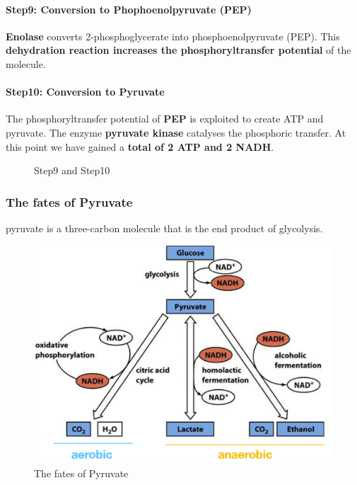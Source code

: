 \documentclass[../main.tex]{subfiles}
\begin{document}
\paragraph{Step9: Conversion to Phophoenolpyruvate (PEP)}
\textbf{Enolase} converts 2-phosphoglycerate into phosphoenolpyruvate (PEP). This \textbf{dehydration reaction increases the phosphoryltransfer potential} of the molecule.

\paragraph{Step10: Conversion to Pyruvate}
The phosphoryltransfer potential of \textbf{PEP} is exploited to create ATP and pyruvate. The enzyme \textbf{pyruvate kinase} catalyses the phosphoric transfer. At this point we have gained a \textbf{total of 2 ATP and 2 NADH}. 
\begin{figure}[h!]
	\centering
	\caption{Step9 and Step10}
\end{figure}

\subsubsection{The fates of Pyruvate}
\gls{pyruvate} is a three-carbon molecule that is the end product of glycolysis.

\begin{figure}[H]
	\centering
	\includegraphics[width = 0.7 \textwidth]{fate_of_pyruvate}
	\caption{The fates of Pyruvate}
\end{figure}
\end{document}
